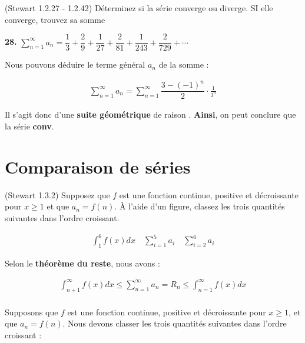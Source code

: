 \documentclass{report}
\begin{document}
    \begin{Exercice}{(Stewart 1.2.27 - 1.2.42)}{}
        Déterminez si la série converge ou diverge. SI elle converge, trouvez sa somme
    \end{Exercice}
    
    
    \noindent
    \textbf{28.} 
    $\sum_{n=1}^{\infty }a_n = \dfrac{1}{3} + \dfrac{2}{9} + \dfrac{1}{27} + 
    \dfrac{2}{81} + \dfrac{1}{243} + \dfrac{2}{729} + \cdots$

    \vspace{1em}
    Nous pouvons déduire le terme général $a_n$ de la somme : 

    \begin{align*}
        \sum_{n=1}^{\infty }a_n = 
        \sum_{n=1}^{\infty }\dfrac{3 - (-1)^n}{2} \cdot \frac{1}{3^n}  
    \end{align*}            

    Il s'agit donc d'une \textbf{suite géométrique} de raison .
    \textbf{Ainsi}, on peut conclure que la série \textcolor{myb}{\textbf{conv}}. 



    \section{Comparaison de séries}

    \begin{Exercice}{(Stewart 1.3.2)}{}
        Supposez que $f$ est une fonction continue, positive et décroissante 
        pour $x \geq 1$ et que $a_n = f(n)$. À l'aide d'un figure, classez les trois 
        quantités suivantes dans l'ordre croissant.

        \begin{align*}
            \int_{1}^{6}f(x)dx \quad 
            \sum_{i=1}^{5 }a_i \quad 
            \sum_{i=2}^{6 }a_i
        \end{align*}
    \end{Exercice}

    Selon le \textbf{théorème du reste}, nous avons :   

    \begin{align*}
        \int_{n+1}^{\infty }f(x)dx  \leq 
        \sum_{n=1}^{\infty }a_n = R_n \leq 
        \int_{n=1}^{\infty }f(x)dx 
        \\
    \end{align*}

     Supposons que $f$ est une fonction continue, positive et décroissante pour 
    $x \geq 1$, et que $a_n = f(n)$. Nous devons classer les trois quantités 
    suivantes dans l'ordre croissant :
\end{document}
